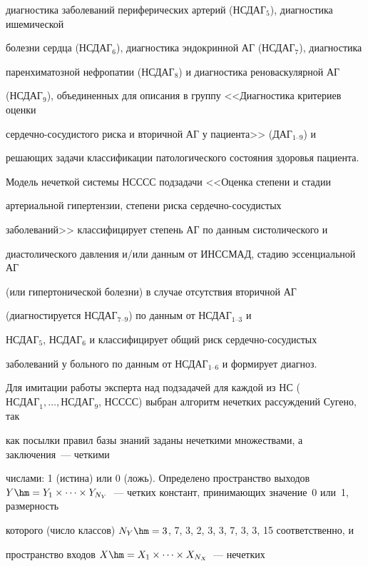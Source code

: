 диагностика заболеваний периферических артерий (НСДАГ$_5$), диагностика ишемической


болезни сердца (НСДАГ$_6$), диагностика эндокринной АГ (НСДАГ$_7$), диагностика


паренхиматозной нефропатии (НСДАГ$_8$) и диагностика реноваскулярной АГ


(НСДАГ$_9$), объединенных для описания в группу <<Диа\-гности\-ка критериев оценки


сер\-деч\-но-со\-су\-ди\-сто\-го риска и вторичной АГ у пациента>> (ДАГ$_{1\mbox{--}9}$) и


решающих задачи классификации патологического состояния здоровья пациента.





 Модель нечеткой системы НСССС подзадачи <<Оценка степени и стадии


артериальной гипертензии, степени риска сер\-деч\-но-со\-су\-ди\-стых


заболеваний>> классифицирует степень АГ по данным систолического и


диастолического давления и/или данным от ИНССМАД, стадию эссенциальной АГ


(или гипертонической болезни) в случае отсутствия вторичной АГ


(диагностируется НСДАГ$_{7\mbox{--}9}$) по данным от НСДАГ$_{1\mbox{--}3}$ и


НСДАГ$_5$, НСДАГ$_6$ и классифицирует общий риск сер\-деч\-но-со\-су\-ди\-стых


заболеваний у больного по данным от НСДАГ$_{1\mbox{--}6}$ и формирует диагноз.





 Для имитации работы эксперта над подзадачей для каждой из НС ($\mathrm{НСДАГ}_1,


\ldots , \mathrm{НСДАГ}_9$, НСССС) выбран алгоритм нечетких рассуждений Сугено, так


как посылки правил базы знаний заданы нечеткими множествами, а заключения~--- четкими


числами: 1 (истина) или 0 (ложь). Определено пространство выходов $Y\hm= Y_1\times


\cdots \times Y_{N_Y}$~--- четких констант, принимающих значение~0 или~1, размерность


которого (число классов) $N_Y\hm= 3$, 7, 3, 2, 3, 3, 7, 3, 3, 15 соответственно, и


пространство входов $X\hm= X_1\times \cdots \times X_{N_X}$~--- нечетких



